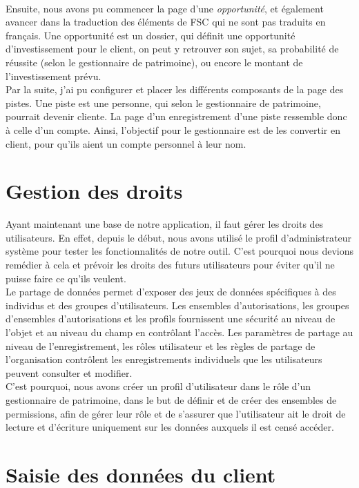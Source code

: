 \documentclass[12pt,oneside,noprintercorrection]{iut}
\begin{document}
~\\\indent Ensuite, nous avons pu commencer la page d'une \textit{opportunité}, et également avancer dans la traduction des éléments de FSC qui ne sont pas traduits en français. Une opportunité est un dossier, qui définit une opportunité d'investissement pour le client, on peut y retrouver son sujet, sa probabilité de réussite (selon le gestionnaire de
patrimoine), ou encore le montant de l'investissement prévu.
~\\\indent Par la suite, j'ai pu configurer et placer les différents composants de la page des pistes. Une piste est une personne, qui selon le gestionnaire de patrimoine, pourrait devenir cliente. La page d'un enregistrement d'une piste ressemble donc à celle d'un compte. Ainsi, l'objectif pour le gestionnaire est de les convertir en client, pour qu'ils aient un compte personnel à leur nom.


\section{Gestion des droits}
Ayant maintenant une base de notre application, il faut gérer les droits des utilisateurs.
En effet, depuis le début, nous avons utilisé le profil d'administrateur système pour tester les fonctionnalités de notre outil. C'est pourquoi nous devions remédier à cela et prévoir les droits des futurs utilisateurs pour éviter qu'il ne puisse faire ce qu'ils veulent.
~\\\indent Le partage de données \slf{} permet d'exposer des jeux de données spécifiques à des individus et des groupes d'utilisateurs. Les ensembles d'autorisations, les groupes d'ensembles d'autorisations et les profils fournissent une sécurité au niveau de l'objet et au niveau du champ en contrôlant l'accès. Les paramètres de partage au niveau de l'enregistrement, les rôles utilisateur et les règles de partage de l'organisation contrôlent les enregistrements individuels que les utilisateurs peuvent consulter et modifier.
~\\\indent C'est pourquoi, nous avons créer un profil d'utilisateur dans le rôle d'un gestionnaire de patrimoine, dans le but de définir et de créer des ensembles de permissions, afin de gérer leur rôle et de s'assurer que l'utilisateur ait le droit de lecture et d'écriture uniquement sur les données auxquels il est censé accéder. 

\section{Saisie des données du client}
\end{document}
